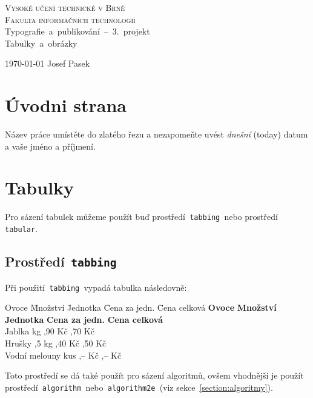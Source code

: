 \documentclass[a4paper, 11pt]{article}
\begin{document}
\makeatletter
\begin{titlepage}
	\begin{center}
		{\Huge \textsc{Vysoké učení technické v Brně}} \\[0.5em]
		{\huge \textsc{Fakulta informačních technologií}} \\[0.6em]
		\quad\hbox{\LARGE{Typografie a publikování -- 3. projekt}} \\[0.6em]
		\quad\hbox{\Huge{Tabulky a obrázky}}
	\end{center}
	\begin{flushright}
		{\Large \today} \hfill \Large Josef Pasek
	\end{flushright}
\end{titlepage}
\makeatother
\section{Úvodni strana}

Název práce umístěte do zlatého řezu a nezapomeňte uvést \textit{dnešní} (today) datum a vaše jméno a příjmení.

\section{Tabulky}

Pro sázení tabulek můžeme použít buď prostředí\texttt{ tabbing }nebo prostředí\texttt{ tabular}.
\subsection{Prostředí\texttt{ tabbing}}
Při použití\texttt{ tabbing }vypadá tabulka následovně:
\begin{tabbing}
	Ovoce \hspace{1.6cm} \= Množství \hspace{0.1cm} \= Jednotka \hspace{0.3cm} \= Cena za jedn. \hspace{0.3cm} \= Cena celková \kill
	\textbf{Ovoce} \> \textbf{Množství} \> \textbf{Jednotka} \> \textbf{Cena za jedn.} \> \textbf{Cena celková} \\
	Jablka  \> kg ,90 Kč ,70 Kč \\
	Hrušky ,5 \> kg ,40 Kč ,50 Kč \\
	Vodní melouny  \> kus ,-- Kč ,-- Kč \\
\end{tabbing}
Toto prostředí se dá také použít pro sázení algoritmů, ovšem vhodnější je použít
prostředí\texttt{ algorithm }nebo\texttt{ algorithm2e }(viz sekce~\ref{section:algoritmy}).
\end{document}

